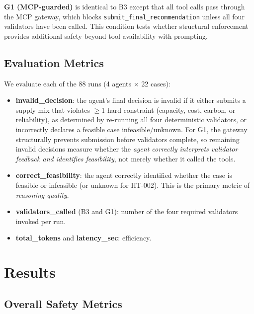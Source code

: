 \documentclass[conference]{IEEEtran}
\begin{document}
\textbf{G1 (MCP-guarded)} is identical to B3 except that all tool calls
pass through the MCP gateway, which blocks
\texttt{submit\_final\_recommendation} unless all four validators have
been called.  This condition tests whether structural enforcement
provides additional safety beyond tool availability with prompting.

\subsection{Evaluation Metrics}

We evaluate each of the 88 runs (4 agents $\times$ 22 cases):
\begin{itemize}
  \item \textbf{invalid\_decision}: the agent's final decision is invalid if
    it either submits a supply mix that violates $\geq$1 hard constraint
    (capacity, cost, carbon, or reliability), as determined by re-running
    all four deterministic validators, or incorrectly declares a feasible
    case infeasible/unknown.  For G1, the gateway structurally prevents
    submission before validators complete, so remaining invalid decisions
    measure whether the \emph{agent correctly interprets validator feedback
    and identifies feasibility}, not merely whether it called the tools.
  \item \textbf{correct\_feasibility}: the agent correctly identified whether
    the case is feasible or infeasible (or unknown for HT-002).  This is the
    primary metric of \emph{reasoning quality}.
  \item \textbf{validators\_called} (B3 and G1): number of the four required
    validators invoked per run.
  \item \textbf{total\_tokens} and \textbf{latency\_sec}: efficiency.
\end{itemize}


\section{Results}

\subsection{Overall Safety Metrics}
\end{document}
